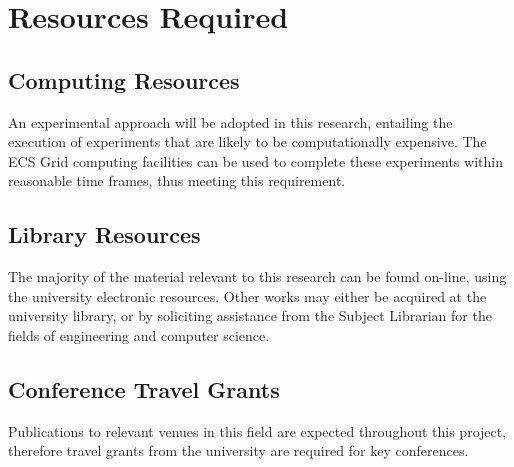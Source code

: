 \begin{itemize}
\end{itemize}


\section{Resources Required}
\subsection{Computing Resources}
An experimental approach will be adopted in this research, entailing the execution of experiments that are likely to be computationally expensive. The ECS Grid computing facilities
can be used to complete these experiments within reasonable time frames, thus meeting this requirement.
\subsection{Library Resources}
The majority of the material relevant to this research can be found on-line, using the university electronic resources. Other works may either be acquired at the university library, or
by soliciting assistance from the Subject Librarian for the fields of engineering and computer science.
\subsection{Conference Travel Grants}
Publications to relevant venues in this field are expected throughout this project, therefore
travel grants from the university are required for key conferences.